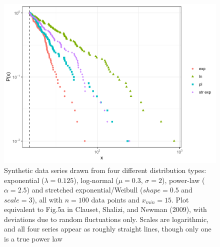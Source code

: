 \documentclass[
  12pt,
  a4paper, twoside]{book}
\begin{document}
\begin{figure}

{\centering \includegraphics[width=0.9\linewidth]{bookdown-demo_files/figure-latex/05-distfit-1} 

}

\caption[Heavy-tailed distributions resembling power laws]{Synthetic data series drawn from four different distribution types: exponential (\(\lambda=0.125\)), log-normal (\(\mu=0.3\), \(\sigma=2\)), power-law (\(\alpha=2.5\)) and stretched exponential/Weibull (\(shape = 0.5\) and \(scale = 3\)), all with \(n=100\) data points and \(x_{min}=15\). Plot equivalent to Fig.5a in Clauset, Shalizi, and Newman (2009), with deviations due to random fluctuations only. Scales are logarithmic, and all four series appear as roughly straight lines, though only one is a true power law}\label{fig:05-distfit}
\end{figure}
\end{document}
